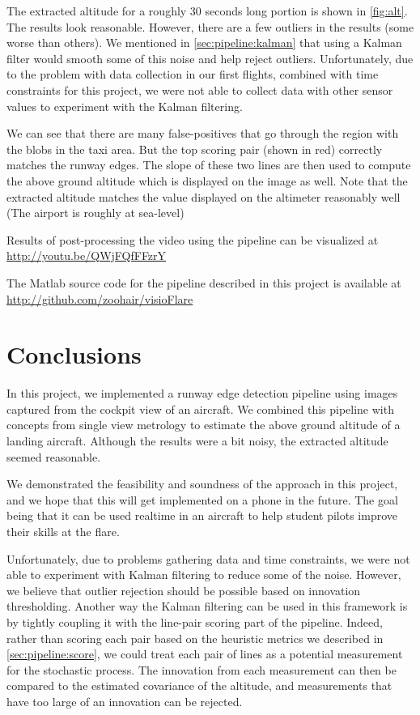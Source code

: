 \documentclass[letterpaper, conference]{IEEEtran}  %
\begin{document}
The extracted altitude for a roughly 30 seconds long portion is shown in \cref{fig:alt}. The results look reasonable. However, there are a few outliers in the results (some worse than others). We mentioned in \cref{sec:pipeline:kalman} that using a Kalman filter would smooth some of this noise and help reject outliers. Unfortunately, due to the problem with data collection in our first flights, combined with time constraints for this project, we were not able to collect data with other sensor values to experiment with the Kalman filtering.

We can see that there are many false-positives that go through the region with the blobs in the taxi area. But the top scoring pair (shown in red) correctly matches the runway edges. The slope of these two lines are then used to compute the above ground altitude which is displayed on the image as well. Note that the extracted altitude matches the value displayed on the altimeter reasonably well (The airport is roughly at sea-level)

Results of post-processing the video using the pipeline can be visualized at \url{http://youtu.be/QWjFQfFFzrY}

The Matlab source code for the pipeline described in this project is available at \url{http://github.com/zoohair/visioFlare}

\section{Conclusions}
In this project, we implemented a runway edge detection pipeline using images captured from the cockpit view of an aircraft. We combined this pipeline with concepts from single view metrology to estimate the above ground altitude of a landing aircraft. Although the results were a bit noisy, the extracted altitude seemed reasonable.

We demonstrated the feasibility and soundness of the approach in this project, and we hope that this will get implemented on a phone in the future. The goal being that it can be used realtime in an aircraft to help student pilots improve their skills at the flare.

Unfortunately, due to problems gathering data and time constraints, we were not able to experiment with Kalman filtering to reduce some of the noise. However, we believe that outlier rejection should be possible based on innovation thresholding. Another way the Kalman filtering can be used in this framework is by tightly coupling it with the line-pair scoring part of the pipeline. Indeed, rather than scoring each pair based on the heuristic metrics we described in \cref{sec:pipeline:score}, we could treat each pair of lines as a potential measurement for the stochastic process. The innovation from each measurement can then be compared to the estimated covariance of the altitude, and measurements that have too large of an innovation can be rejected.

\newpage
\printbibliography
\end{document}

